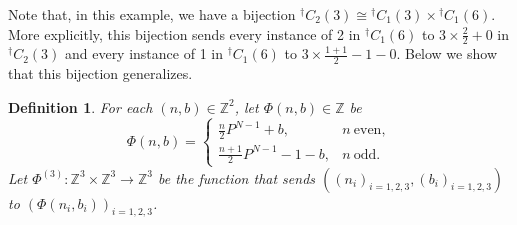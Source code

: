 \documentclass[11pt]{amsart}
\newtheorem{definition}[theorem]{Definition}
\begin{document}
Note that, in this example, we have a bijection ${}^\dagger C_2(3)\cong {}^\dagger C_1(3)\times {}^\dagger C_1(6)$.
More explicitly, this bijection sends every instance of 2 in ${}^\dagger C_1(6)$ to $3\times \frac{2}{2}+0$ in ${}^\dagger C_2(3)$ and every instance of 1 in ${}^\dagger C_1(6)$ to $3\times\frac{1+1}{2}-1-0$.
Below we show that this bijection generalizes. 

\begin{definition}
For each $(n,b)\in \mathbb{Z}^2$, let $\Phi(n,b)\in \mathbb{Z}$ be 
\begin{equation}\label{eq: Phinb}
    \Phi(n,b)=\begin{cases}
        \frac{n}{2}P^{N-1}+b, & n\ \text{even},\\
       \frac{n+1}{2} P^{N-1}-1-b, & n\ \text{odd}.
        \end{cases}
\end{equation}
Let $\Phi^{(3)}: \mathbb{Z}^3\times \mathbb{Z}^3\to \mathbb{Z}^3$ be the function that sends $((n_i)_{i=1,2,3}, (b_i)_{i=1,2,3})$ to $(\Phi(n_i,b_i))_{i=1,2,3}$.
\end{definition}
\end{document}
